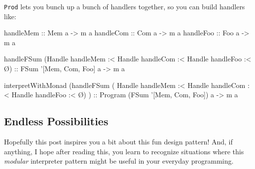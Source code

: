 \documentclass[]{article}
\newenvironment{Shaded}{}{}
\newcommand{\DataTypeTok}[1]{\textcolor[rgb]{0.56,0.13,0.00}{#1}}
\newcommand{\FunctionTok}[1]{\textcolor[rgb]{0.02,0.16,0.49}{#1}}
\newcommand{\NormalTok}[1]{#1}
\newcommand{\OtherTok}[1]{\textcolor[rgb]{0.00,0.44,0.13}{#1}}
\begin{document}
\texttt{Prod} lets you bunch up a bunch of handlers together, so you can build
handlers like:

\begin{Shaded}
\begin{Highlighting}[]
\OtherTok{handleMem ::} \DataTypeTok{Mem}\NormalTok{ a }\OtherTok{->}\NormalTok{ m a}
\OtherTok{handleCom ::} \DataTypeTok{Com}\NormalTok{ a }\OtherTok{->}\NormalTok{ m a}
\OtherTok{handleFoo ::} \DataTypeTok{Foo}\NormalTok{ a }\OtherTok{->}\NormalTok{ m a}

\NormalTok{handleFSum (}\DataTypeTok{Handle}\NormalTok{ handleMem }\FunctionTok{:<} \DataTypeTok{Handle}\NormalTok{ handleCom }\FunctionTok{:<} \DataTypeTok{Handle}\NormalTok{ handleFoo }\FunctionTok{:<}\NormalTok{ Ø)}
\OtherTok{    ::} \DataTypeTok{FSum}\NormalTok{ '[}\DataTypeTok{Mem}\NormalTok{, }\DataTypeTok{Com}\NormalTok{, }\DataTypeTok{Foo}\NormalTok{] a }\OtherTok{->}\NormalTok{ m a}

\NormalTok{interpretWithMonad}
\NormalTok{        (handleFSum ( }\DataTypeTok{Handle}\NormalTok{ handleMem}
                   \FunctionTok{:<} \DataTypeTok{Handle}\NormalTok{ handleCom}
                   \FunctionTok{:<} \DataTypeTok{Handle}\NormalTok{ handleFoo}
                   \FunctionTok{:<}\NormalTok{ Ø)}
\NormalTok{        )}
\OtherTok{    ::} \DataTypeTok{Program}\NormalTok{ (}\DataTypeTok{FSum}\NormalTok{ '[}\DataTypeTok{Mem}\NormalTok{, }\DataTypeTok{Com}\NormalTok{, }\DataTypeTok{Foo}\NormalTok{]) a }\OtherTok{->}\NormalTok{ m a}
\end{Highlighting}
\end{Shaded}

\hypertarget{endless-possibilities}{%
\subsection{Endless Possibilities}\label{endless-possibilities}}

Hopefully this post inspires you a bit about this fun design pattern! And, if
anything, I hope after reading this, you learn to recognize situations where
this \emph{modular} interpreter pattern might be useful in your everyday
programming.
\end{document}
